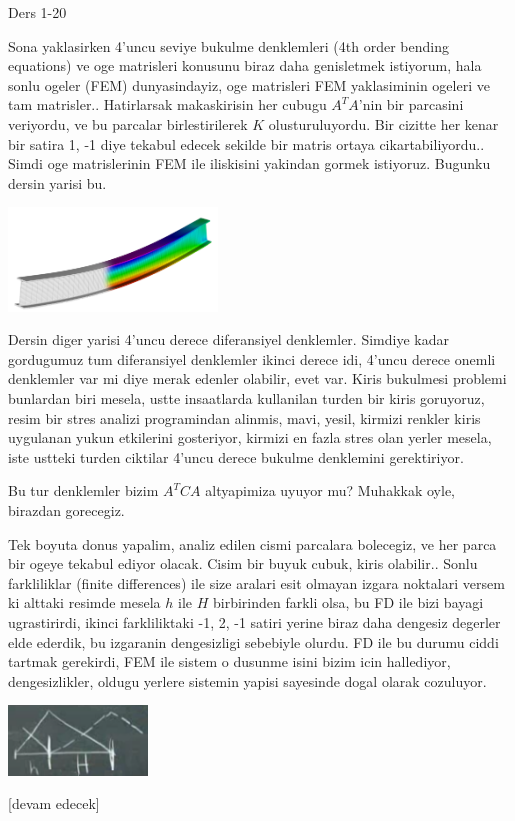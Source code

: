 \documentclass[12pt,fleqn]{article}\usepackage{../../common}
\begin{document}
Ders 1-20

Sona yaklasirken 4'uncu seviye bukulme denklemleri (4th order bending equations)
ve oge matrisleri konusunu biraz daha genisletmek istiyorum, hala sonlu ogeler
(FEM) dunyasindayiz, oge matrisleri FEM yaklasiminin ogeleri ve tam
matrisler.. Hatirlarsak makaskirisin her cubugu $A^T A$'nin bir parcasini
veriyordu, ve bu parcalar birlestirilerek $K$ olusturuluyordu. Bir cizitte her
kenar bir satira 1, -1 diye tekabul edecek sekilde bir matris ortaya
cikartabiliyordu.. Simdi oge matrislerinin FEM ile iliskisini yakindan gormek
istiyoruz. Bugunku dersin yarisi bu.

\includegraphics[width=15em]{compscieng_1_20_01.png}

Dersin diger yarisi 4'uncu derece diferansiyel denklemler. Simdiye kadar
gordugumuz tum diferansiyel denklemler ikinci derece idi, 4'uncu derece onemli
denklemler var mi diye merak edenler olabilir, evet var. Kiris bukulmesi
problemi bunlardan biri mesela, ustte insaatlarda kullanilan turden bir kiris
goruyoruz, resim bir stres analizi programindan alinmis, mavi, yesil, kirmizi
renkler kiris uygulanan yukun etkilerini gosteriyor, kirmizi en fazla stres olan
yerler mesela, iste ustteki turden ciktilar 4'uncu derece bukulme denklemini
gerektiriyor.

Bu tur denklemler bizim $A^T C A$ altyapimiza uyuyor mu? Muhakkak oyle,
birazdan gorecegiz. 

Tek boyuta donus yapalim, analiz edilen cismi parcalara bolecegiz, ve her parca
bir ogeye tekabul ediyor olacak. Cisim bir buyuk cubuk, kiris olabilir..  Sonlu
farkliliklar (finite differences) ile size aralari esit olmayan izgara noktalari
versem ki alttaki resimde mesela $h$ ile $H$ birbirinden farkli olsa, bu FD ile
bizi bayagi ugrastirirdi, ikinci farkliliktaki -1, 2, -1 satiri yerine biraz
daha dengesiz degerler elde ederdik, bu izgaranin dengesizligi sebebiyle
olurdu. FD ile bu durumu ciddi tartmak gerekirdi, FEM ile sistem o dusunme isini
bizim icin hallediyor, dengesizlikler, oldugu yerlere sistemin yapisi
sayesinde dogal olarak cozuluyor. 

\includegraphics[width=10em]{compscieng_1_20_02.png}



















[devam edecek]
\end{document}
